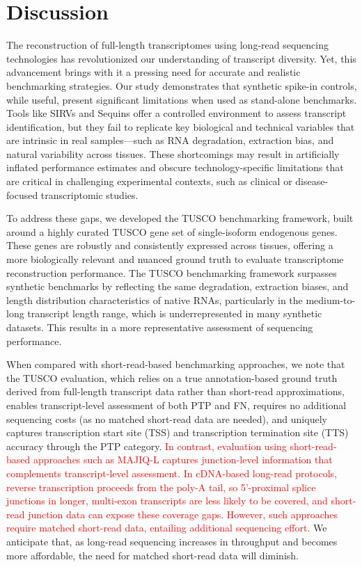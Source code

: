 \documentclass[pdflatex,sn-nature]{sn-jnl}%
\newcommand{\tuscoGeneSet}{TUSCO gene set}
\newcommand{\tuscoBenchmarkingFramework}{TUSCO benchmarking framework}
\begin{document}

\section{Discussion}

The reconstruction of full-length transcriptomes using long-read sequencing technologies has revolutionized our understanding of transcript diversity. Yet, this advancement brings with it a pressing need for accurate and realistic benchmarking strategies. Our study demonstrates that synthetic spike-in controls, while useful, present significant limitations when used as stand-alone benchmarks. Tools like SIRVs and Sequins offer a controlled environment to assess transcript identification, but they fail to replicate key biological and technical variables that are intrinsic in real samples---such as RNA degradation, extraction bias, and natural variability across tissues. These shortcomings may result in artificially inflated performance estimates and obscure technology-specific limitations that are critical in challenging experimental contexts, such as clinical or disease-focused transcriptomic studies.

To address these gaps, we developed the \tuscoBenchmarkingFramework{}, built around a highly curated \tuscoGeneSet{} of single-isoform endogenous genes. These genes are robustly and consistently expressed across tissues, offering a more biologically relevant and nuanced ground truth to evaluate transcriptome reconstruction performance. The \tuscoBenchmarkingFramework{} surpasses synthetic benchmarks by reflecting the same degradation, extraction biases, and length distribution characteristics of native RNAs, particularly in the medium-to-long transcript length range, which is underrepresented in many synthetic datasets. This results in a more representative assessment of sequencing performance.

When compared with short-read-based benchmarking approaches, we note that the TUSCO evaluation, which relies on a true annotation-based ground truth derived from full-length transcript data rather than short-read approximations, enables transcript-level assessment of both PTP and FN, requires no additional sequencing costs (as no matched short-read data are needed), and uniquely captures transcription start site (TSS) and transcription termination site (TTS) accuracy through the PTP category. \textcolor{red}{In contrast, evaluation using short-read-based approaches such as MAJIQ-L captures junction-level information that complements transcript-level assessment. In cDNA-based long-read protocols, reverse transcription proceeds from the poly-A tail, so 5'-proximal splice junctions in longer, multi-exon transcripts are less likely to be covered, and short-read junction data can expose these coverage gaps. However, such approaches require matched short-read data, entailing additional sequencing effort.} We anticipate that, as long-read sequencing increases in throughput and becomes more affordable, the need for matched short-read data will diminish.
\end{document}

